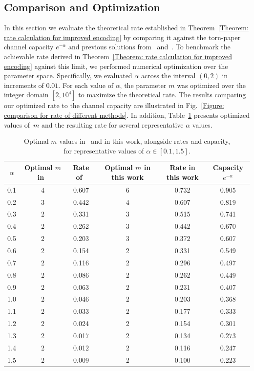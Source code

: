 \documentclass[journal,letterpaper,onecolumn,11pt]{IEEEtran}
\begin{document}
\subsection{Comparison and Optimization}\label{section:comparison}
In this section we evaluate the theoretical rate established in Theorem~\ref{Theorem: rate calculation for improved encoding} by comparing it against the torn-paper channel capacity $e^{-\alpha}$ and previous solutions from~\cite{shomorony2021torn} and~\cite{Junsheng2026torn}. 
To benchmark the achievable rate derived in Theorem~\ref{Theorem: rate calculation for improved encoding} against this limit, we performed numerical optimization over the parameter space. Specifically, we evaluated $\alpha$ across the interval $(0, 2)$ in increments of $0.01$. 
For each value of $\alpha$, the parameter $m$ was optimized over the integer domain $[2, 10^4]$ to maximize the theoretical rate. 
The results comparing our optimized rate to the channel capacity are illustrated in Fig.~\ref{Figure: comparison for rate of different methods}.
In addition, Table~\ref{tab:f1f2capacity} presents optimized values of~$m$ and the resulting rate for several representative $\alpha$ values.
\begin{table}[ht]
\centering
\begin{tabular}{c c c c c c}
\hline
$\alpha$ & Optimal $m$ in~\cite{shomorony2021torn}& Rate of~\cite{shomorony2021torn}& Optimal $m$ in this work & Rate in this work & Capacity $e^{-\alpha}$ \\
\hline
0.1 & 4 & 0.607 & 6 & 0.732 & 0.905 \\
0.2 & 3 & 0.442 & 4 & 0.607 & 0.819 \\
0.3 & 2 & 0.331 & 3 & 0.515 & 0.741 \\
0.4 & 2 & 0.262 & 3 & 0.442 & 0.670 \\
0.5 & 2 & 0.203 & 3 & 0.372 & 0.607 \\
0.6 & 2 & 0.154 & 2 & 0.331 & 0.549 \\
0.7 & 2 & 0.116 & 2 & 0.296 & 0.497 \\
0.8 & 2 & 0.086 & 2 & 0.262 & 0.449 \\
0.9 & 2 & 0.063 & 2 & 0.231 & 0.407 \\
1.0 & 2 & 0.046 & 2 & 0.203 & 0.368 \\
1.1 & 2 & 0.033 & 2 & 0.177 & 0.333 \\
1.2 & 2 & 0.024 & 2 & 0.154 & 0.301 \\
1.3 & 2 & 0.017 & 2 & 0.134 & 0.273 \\
1.4 & 2 & 0.012 & 2 & 0.116 & 0.247 \\
1.5 & 2 & 0.009 & 2 & 0.100 & 0.223
\end{tabular}
\caption{Optimal $m$ values in~\cite{shomorony2021torn} and in this work, alongside rates and capacity,\\for representative values of $\alpha \in [0.1,1.5]$.}
\label{tab:f1f2capacity}
\end{table}
\end{document}
